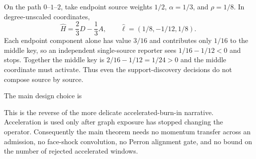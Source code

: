 \begin{remark}
On the path $0$--$1$--$2$, take endpoint source weights $1/2$, $\alpha=1/3$,
and $\rho=1/8$.  In degree-unscaled coordinates,
\begin{equation*}
 \widehat H=\frac23D-\frac13A,\qquad
 \widehat\ell=(1/8,-1/12,1/8).
\end{equation*}
Each endpoint component alone has value $3/16$ and contributes only $1/16$
to the middle key, so an independent single-source reporter sees
$1/16-1/12<0$ and stops.  Together the middle key is
$2/16-1/12=1/24>0$ and the middle coordinate must activate.  Thus even the
support-discovery decisions do not compose source by source.
\end{remark}

The main design choice is
\begin{center}
\end{center}
This is the reverse of the more delicate accelerated-burn-in narrative.
Acceleration is used only after graph exposure has stopped changing the
operator.  Consequently the main theorem needs no momentum transfer across an
admission, no face-shock convolution, no Perron alignment gate, and no bound
on the number of rejected accelerated windows.

